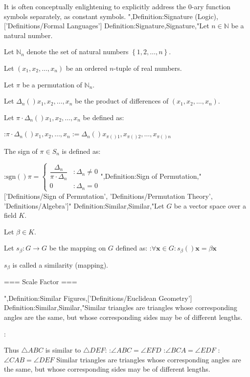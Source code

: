 It is often conceptually enlightening to explicitly address the $0$-ary function symbols separately, as constant symbols.
",Definition:Signature (Logic),['Definitions/Formal Languages']
Definition:Signature,Signature,"Let $n \in \mathbb N$ be a natural number.

Let $\mathbb N_n$ denote the set of natural numbers $\left\lbrace 1, 2, \ldots, n \right\rbrace$.

Let $\left( x_1, x_2, \ldots, x_n \right)$ be an ordered $n$-tuple of real numbers.

Let $\pi$ be a permutation of $\mathbb N_n$.

Let $\Delta_n \left(   \right){x_1, x_2, \ldots, x_n}$ be the product of differences of $\left( x_1, x_2, \ldots, x_n \right)$.

Let $\pi \cdot \Delta_n \left(   \right){x_1, x_2, \ldots, x_n}$ be defined as:

:$\pi \cdot \Delta_n \left(   \right){x_1, x_2, \ldots, x_n} := \Delta_n \left(   \right){x_{\pi \left(   \right)1}, x_{\pi \left(   \right)2}, \ldots, x_{\pi \left(   \right)n} }$


The sign of $\pi \in S_n$ is defined as:

:$\mathrm {sgn} \left(   \right)\pi = \begin {cases}
\dfrac {\Delta_n} {\pi \cdot \Delta_n} & : \Delta_n \ne 0 \\
0 & : \Delta_n = 0 \end {cases}$",Definition:Sign of Permutation,"['Definitions/Sign of Permutation', 'Definitions/Permutation Theory', 'Definitions/Algebra']"
Definition:Similar,Similar,"Let $G$ be a vector space over a field $K$.

Let $\beta \in K$.

Let $s_\beta: G \to G$ be the mapping on $G$ defined as:
:$\forall \mathbf x \in G: s_\beta \left(   \right){\mathbf x} = \beta \mathbf x$


$s_\beta$ is called a similarity (mapping).


=== Scale Factor ===

",Definition:Similar Figures,['Definitions/Euclidean Geometry']
Definition:Similar,Similar,"Similar triangles are triangles whose corresponding angles are the same, but whose corresponding sides may be of different lengths.

:

Thus $\triangle ABC$ is similar to $\triangle DEF$:
:$\angle ABC = \angle EFD$
:$\angle BCA = \angle EDF$
:$\angle CAB = \angle DEF$
Similar triangles are triangles whose corresponding angles are the same, but whose corresponding sides may be of different lengths.

